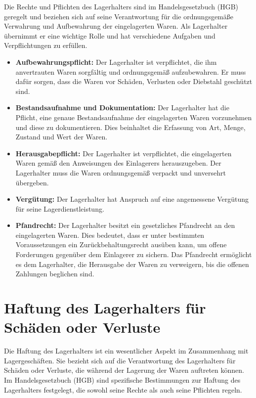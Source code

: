 Die Rechte und Pflichten des Lagerhalters sind im Handelsgesetzbuch (HGB) geregelt und beziehen sich auf seine Verantwortung für die ordnungsgemäße Verwahrung und Aufbewahrung der eingelagerten Waren. Als Lagerhalter übernimmt er eine wichtige Rolle und hat verschiedene Aufgaben und Verpflichtungen zu erfüllen.
\begin{itemize}
    \item \textbf{Aufbewahrungspflicht:} Der Lagerhalter ist verpflichtet, die ihm anvertrauten Waren sorgfältig und ordnungsgemäß aufzubewahren. Er muss dafür sorgen, dass die Waren vor Schäden, Verlusten oder Diebstahl geschützt sind.
    \item \textbf{Bestandsaufnahme und Dokumentation:} Der Lagerhalter hat die Pflicht, eine genaue Bestandsaufnahme der eingelagerten Waren vorzunehmen und diese zu dokumentieren. Dies beinhaltet die Erfassung von Art, Menge, Zustand und Wert der Waren.
    \item \textbf{Herausgabepflicht:} Der Lagerhalter ist verpflichtet, die eingelagerten Waren gemäß den Anweisungen des Einlagerers herauszugeben. Der Lagerhalter muss die Waren ordnungsgemäß verpackt und unversehrt übergeben.
    \item \textbf{Vergütung:} Der Lagerhalter hat Anspruch auf eine angemessene Vergütung für seine Lagerdienstleistung.
    \item \textbf{Pfandrecht:} Der Lagerhalter besitzt ein gesetzliches Pfandrecht an den eingelagerten Waren. Dies bedeutet, dass er unter bestimmten Voraussetzungen ein Zurückbehaltungsrecht ausüben kann, um offene Forderungen gegenüber dem Einlagerer zu sichern. Das Pfandrecht ermöglicht es dem Lagerhalter, die Herausgabe der Waren zu verweigern, bis die offenen Zahlungen beglichen sind.
\end{itemize}

\section{Haftung des Lagerhalters für Schäden oder Verluste}
Die Haftung des Lagerhalters ist ein wesentlicher Aspekt im Zusammenhang mit Lagergeschäften. Sie bezieht sich auf die Verantwortung des Lagerhalters für Schäden oder Verluste, die während der Lagerung der Waren auftreten können. Im Handelsgesetzbuch (HGB) sind spezifische Bestimmungen zur Haftung des Lagerhalters festgelegt, die sowohl seine Rechte als auch seine Pflichten regeln.

